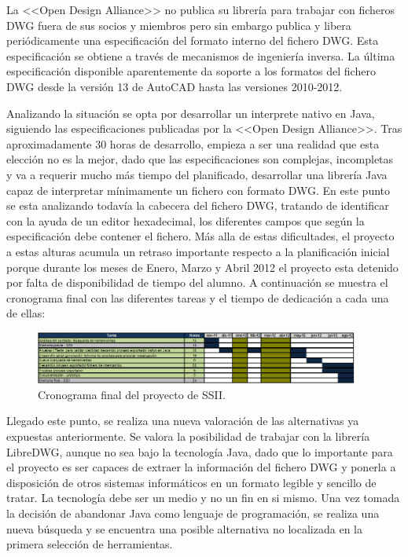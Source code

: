 La <<Open Design Alliance>> no publica su librería para trabajar con ficheros DWG fuera de sus socios y miembros pero sin embargo publica y libera periódicamente una especificación del formato interno del fichero DWG. Esta especificación se obtiene a través de mecanismos de ingeniería inversa. La última especificación disponible aparentemente da soporte a los formatos del fichero DWG desde la versión 13 de AutoCAD hasta las versiones 2010-2012. 

Analizando la situación se opta por desarrollar un interprete nativo en Java, siguiendo las especificaciones publicadas por la <<Open Design Alliance>>. Tras aproximadamente 30 horas de desarrollo, empieza a ser una realidad que esta elección no es la mejor, dado que las especificaciones son complejas, incompletas y va a requerir mucho más tiempo del planificado, desarrollar una librería Java capaz de interpretar mínimamente un fichero con formato DWG. En este punto se esta analizando todavía la cabecera del fichero DWG, tratando de identificar con la ayuda de un editor hexadecimal, los diferentes campos que según la especificación debe contener el fichero. Más alla de estas dificultades, el proyecto a estas alturas acumula un retraso importante respecto a la planificación inicial porque durante los meses de Enero, Marzo y Abril 2012 el proyecto esta detenido por falta de disponibilidad de tiempo del alumno. A continuación se muestra el cronograma final con las diferentes tareas y el tiempo de dedicación a cada una de ellas:

\begin{figure}[H]
\begin{center}
\includegraphics[width=0.95\textwidth]{imgs/schedule}
\caption{Cronograma final del proyecto de SSII.}
\end{center}
\end{figure}

Llegado este punto, se realiza una nueva valoración de las alternativas ya expuestas anteriormente. Se valora la posibilidad de trabajar con la librería LibreDWG, aunque no sea bajo la tecnología Java, dado que lo importante para el proyecto es ser capaces de extraer la información del fichero DWG y ponerla a disposición de otros sistemas informáticos en un formato legible y sencillo de tratar. La tecnología debe ser un medio y no un fin en si mismo. Una vez tomada la decisión de abandonar Java como lenguaje de programación, se realiza una nueva búsqueda y se encuentra una posible alternativa no localizada en la primera selección de herramientas. 

